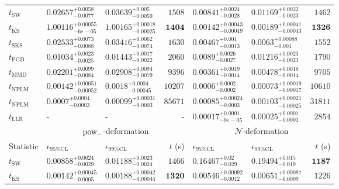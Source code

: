 \begin{tabular}{l|llr|llr}
	\midrule
	$t_{\mathrm{SW}}$ & $0.02657_{-0.0077}^{+0.0058}$ & $0.03639_{-0.0059}^{+0.005}$ & $1508$ & $0.00841_{-0.0028}^{+0.0024}$ & $0.01169_{-0.0023}^{+0.0022}$ & $1462$ \\
	$t_{\overline{\mathrm{KS}}}$ & $1.00116_{-6e-05}^{+0.00055}$ & $1.00165_{-0.00025}^{+0.00018}$ & ${\mathbf{1404}}$ & ${\mathbf{0.00142_{-0.00049}^{+0.00043}}}$ & ${\mathbf{0.00189_{-0.00043}^{+0.00041}}}$ & ${\mathbf{1326}}$ \\
	$t_{\mathrm{SKS}}$ & $0.02533_{-0.0088}^{+0.0073}$ & $0.03416_{-0.0074}^{+0.0062}$ & $1630$ & $0.00467_{-0.0013}^{+0.001}$ & $0.0063_{-0.001}^{+0.00088}$ & $1552$ \\
	$t_{\mathrm{FGD}}$ & ${\mathbf{0.01034_{-0.0025}^{+0.0023}}}$ & ${\mathbf{0.01443_{-0.0022}^{+0.0017}}}$ & $2060$ & $0.0089_{-0.0027}^{+0.0026}$ & $0.01216_{-0.0023}^{+0.0023}$ & $1790$ \\
	$t_{\mathrm{MMD}}$ & $0.02201_{-0.0084}^{+0.0099}$ & $0.02908_{-0.0079}^{+0.0094}$ & $9396$ & $0.00361_{-0.0014}^{+0.0019}$ & $0.00478_{-0.0014}^{+0.0018}$ & $9705$ \\
\rowcolor{red!35}	$t_{\mathrm{NPLM}}$ & $0.00142_{-0.00052}^{+0.00051}$ & $0.0018_{-0.00045}^{+0.0004}$ & $10207$ & $0.0006_{-0.0002}^{+0.0002}$ & $0.00073_{-0.00017}^{+0.00019}$ & $10610$ \\
\rowcolor{blue!35}	$t_{\mathrm{NPLM}}$ & $0.0007_{-0.0003}^{+0.0004}$ & $0.00099_{-0.0003}^{+0.00031}$ & $85671$ & $0.00085_{-0.0003}^{+0.00024}$ & $0.00103_{-0.00025}^{+0.00021}$ & $31811$ \\
	$t_{\mathrm{LLR}}$ & - & - & - & $0.00017_{-9e-05}^{+0.0001}$ & $0.00025_{-0.0001}^{+0.0001}$ & $2854$ \\
	\toprule
	\multicolumn{1}{c}{} & \multicolumn{3}{c}{$\rm{pow}_{-}$-deformation} & \multicolumn{3}{c}{$\mathcal{N}$-deformation} \\
	Statistic & $\epsilon_{95\%\mathrm{CL}}$ & $\epsilon_{99\%\mathrm{CL}}$ & $t$ (s) & $\epsilon_{95\%\mathrm{CL}}$ & $\epsilon_{99\%\mathrm{CL}}$ & $t$ (s) \\
	\midrule
	$t_{\mathrm{SW}}$ & $0.00858_{-0.0029}^{+0.0024}$ & $0.01188_{-0.0024}^{+0.0023}$ & $1466$ & $0.16467_{-0.029}^{+0.02}$ & $0.19494_{-0.019}^{+0.015}$ & ${\mathbf{1187}}$ \\
	$t_{\overline{\mathrm{KS}}}$ & ${\mathbf{0.00142_{-0.0005}^{+0.00045}}}$ & ${\mathbf{0.00188_{-0.00044}^{+0.00042}}}$ & ${\mathbf{1320}}$ & ${\mathbf{0.00546_{-0.0012}^{+0.00092}}}$ & ${\mathbf{0.00651_{-0.0009}^{+0.00087}}}$ & $1226$ \\

\end{tabular}
